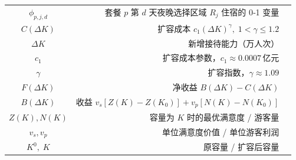 \begin{table}[htbp]
\begin{tabularx}{\textwidth}{|C|D|U|}
    $\phi_{p,j,d}$ & 套餐 $p$ 第 $d$ 天夜晚选择区域 $R_j$ 住宿的 0‑1 变量 \\
    $C(\Delta K)$ & 扩容成本 $c_1(\Delta K)^{\gamma},\;1<\gamma\le1.2$ \\
    $\Delta K$ & 新增接待能力（万人次） \\
    $c_1$ & 扩容成本参数，$c_1 \approx 0.0007$ 亿元 \\
    $\gamma$ & 扩容指数，$\gamma \approx 1.09$ \\
    $F(\Delta K)$ & 净收益 $B(\Delta K)-C(\Delta K)$ \\
    $B(\Delta K)$ & 收益 $v_s[Z(K)-Z(K_0)] + v_p[N(K)-N(K_0)]$ \\
    $Z(K), N(K)$ & 容量为 $K$ 时的最优满意度 / 游客量 \\
    $v_s, v_p$ & 单位满意度价值 / 单位游客利润 \\
    $K^0,\;K$ & 原容量 / 扩容后容量 \\
    \hline
  \end{tabularx}
\end{table}


